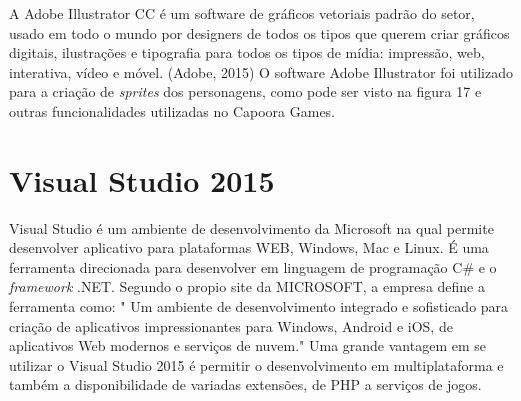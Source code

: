 A Adobe Illustrator CC é um software de gráficos vetoriais padrão do setor, usado em todo o mundo por designers de todos os tipos que querem criar gráficos digitais, ilustrações e tipografia para todos os tipos de mídia: impressão, web, interativa, vídeo e móvel. (Adobe, 2015)
O software Adobe Illustrator foi utilizado para a criação de \textit{sprites} dos personagens, como pode ser visto na figura 17 e outras funcionalidades utilizadas no Capoora Games.

\begin{figure}[h!]
		\centering
	\end{figure}
	\pagebreak
	\section{Visual Studio 2015}
\label{sec:Visual Studio 2015}

Visual Studio  é um ambiente de desenvolvimento da Microsoft na qual permite desenvolver aplicativo para plataformas WEB, Windows, Mac e Linux. É uma ferramenta direcionada para desenvolver em linguagem de programação C\# e o \textit{framework} .NET.
Segundo o propio site da MICROSOFT, a empresa define a ferramenta como: " Um ambiente de desenvolvimento integrado e sofisticado para criação de aplicativos impressionantes para Windows, Android e iOS, de aplicativos Web modernos e serviços de nuvem."
Uma grande vantagem em se utilizar o Visual Studio 2015 é permitir o desenvolvimento em multiplataforma e também a disponibilidade de variadas extensões, de PHP a serviços de jogos.

